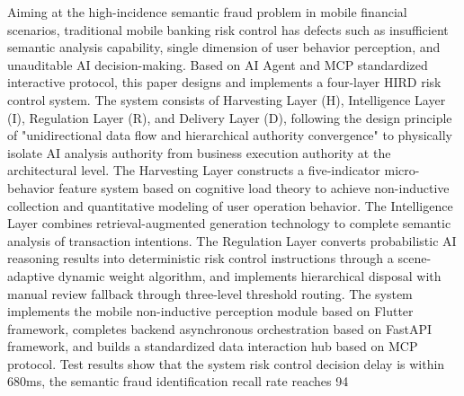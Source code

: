 Aiming at the high-incidence semantic fraud problem in mobile financial scenarios, traditional mobile banking risk control has defects such as insufficient semantic analysis capability, single dimension of user behavior perception, and unauditable AI decision-making. Based on AI Agent and MCP standardized interactive protocol, this paper designs and implements a four-layer HIRD risk control system. The system consists of Harvesting Layer (H), Intelligence Layer (I), Regulation Layer (R), and Delivery Layer (D), following the design principle of "unidirectional data flow and hierarchical authority convergence" to physically isolate AI analysis authority from business execution authority at the architectural level. The Harvesting Layer constructs a five-indicator micro-behavior feature system based on cognitive load theory to achieve non-inductive collection and quantitative modeling of user operation behavior. The Intelligence Layer combines retrieval-augmented generation technology to complete semantic analysis of transaction intentions. The Regulation Layer converts probabilistic AI reasoning results into deterministic risk control instructions through a scene-adaptive dynamic weight algorithm, and implements hierarchical disposal with manual review fallback through three-level threshold routing. The system implements the mobile non-inductive perception module based on Flutter framework, completes backend asynchronous orchestration based on FastAPI framework, and builds a standardized data interaction hub based on MCP protocol. Test results show that the system risk control decision delay is within 680ms, the semantic fraud identification recall rate reaches 94%